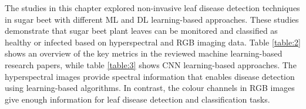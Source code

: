 \FloatBarrier

The studies in this chapter explored non-invasive leaf disease detection techniques in sugar beet with different ML and DL learning-based approaches. These studies demonstrate that sugar beet plant leaves can be monitored and classified as healthy or infected based on hyperspectral and RGB imaging data. Table \ref{table:2} shows an overview of the key metrics in the reviewed machine learning-based research papers, while table \ref{table:3} shows CNN learning-based approaches. The hyperspectral images provide spectral information that enables disease detection using learning-based algorithms. In contrast, the colour channels in RGB images give enough information for leaf disease detection and classification tasks.
    
   

